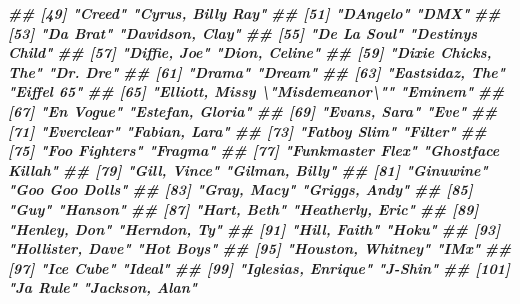 \documentclass[
  11pt]{report}
\newenvironment{Shaded}{\begin{snugshade}}{\end{snugshade}}
\newcommand{\DocumentationTok}[1]{\textcolor[rgb]{0.56,0.35,0.01}{\textbf{\textit{#1}}}}
\renewenvironment{Shaded}{
    \begin{mdframed}[%
      roundcorner=2pt,%
      innerleftmargin=5pt,%
      innerrightmargin=5pt,%
      topline=true,%
      leftline=true,%
      rightline=true,%
      bottomline=true,%
      linewidth=0.5pt,%
      linecolor=black!20,%
      backgroundcolor=black!2,%
      skipabove=2ex,%
      skipbelow=2.5ex%
    ]%
  }
  {
    \end{mdframed}
  }
\begin{document}
\begin{itemize}
\begin{Shaded}
\begin{Highlighting}[]
\DocumentationTok{\#\#  [49] "Creed"                          "Cyrus, Billy Ray"              }
\DocumentationTok{\#\#  [51] "D\textquotesingle{}Angelo"                       "DMX"                           }
\DocumentationTok{\#\#  [53] "Da Brat"                        "Davidson, Clay"                }
\DocumentationTok{\#\#  [55] "De La Soul"                     "Destiny\textquotesingle{}s Child"               }
\DocumentationTok{\#\#  [57] "Diffie, Joe"                    "Dion, Celine"                  }
\DocumentationTok{\#\#  [59] "Dixie Chicks, The"              "Dr. Dre"                       }
\DocumentationTok{\#\#  [61] "Drama"                          "Dream"                         }
\DocumentationTok{\#\#  [63] "Eastsidaz, The"                 "Eiffel 65"                     }
\DocumentationTok{\#\#  [65] "Elliott, Missy \textbackslash{}"Misdemeanor\textbackslash{}"" "Eminem"                        }
\DocumentationTok{\#\#  [67] "En Vogue"                       "Estefan, Gloria"               }
\DocumentationTok{\#\#  [69] "Evans, Sara"                    "Eve"                           }
\DocumentationTok{\#\#  [71] "Everclear"                      "Fabian, Lara"                  }
\DocumentationTok{\#\#  [73] "Fatboy Slim"                    "Filter"                        }
\DocumentationTok{\#\#  [75] "Foo Fighters"                   "Fragma"                        }
\DocumentationTok{\#\#  [77] "Funkmaster Flex"                "Ghostface Killah"              }
\DocumentationTok{\#\#  [79] "Gill, Vince"                    "Gilman, Billy"                 }
\DocumentationTok{\#\#  [81] "Ginuwine"                       "Goo Goo Dolls"                 }
\DocumentationTok{\#\#  [83] "Gray, Macy"                     "Griggs, Andy"                  }
\DocumentationTok{\#\#  [85] "Guy"                            "Hanson"                        }
\DocumentationTok{\#\#  [87] "Hart, Beth"                     "Heatherly, Eric"               }
\DocumentationTok{\#\#  [89] "Henley, Don"                    "Herndon, Ty"                   }
\DocumentationTok{\#\#  [91] "Hill, Faith"                    "Hoku"                          }
\DocumentationTok{\#\#  [93] "Hollister, Dave"                "Hot Boys"                      }
\DocumentationTok{\#\#  [95] "Houston, Whitney"               "IMx"                           }
\DocumentationTok{\#\#  [97] "Ice Cube"                       "Ideal"                         }
\DocumentationTok{\#\#  [99] "Iglesias, Enrique"              "J{-}Shin"                        }
\DocumentationTok{\#\# [101] "Ja Rule"                        "Jackson, Alan"                 }

\end{Highlighting}
\end{Shaded}
\end{itemize}
\end{document}
